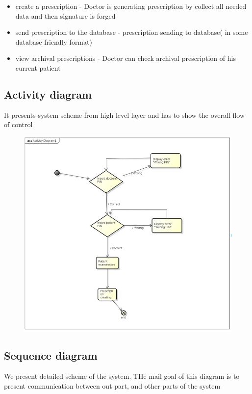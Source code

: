 \begin{itemize}


\item create a prescription - Doctor is generating prescription by collect all needed data and then signature is forged
\item send prescription to the database - prescription sending to database( in some database friendly format)
\item view archival prescriptions - Doctor can check archival prescription of his current patient
\end{itemize}

\subsection{Activity diagram}
It presents system scheme from high level layer and has to show the overall flow of control
\begin{figure}[h]
\centering
\includegraphics[width=1\textwidth]{doctor/ActivityDiagram.png}
\end{figure} 
\subsection{Sequence diagram}
We present detailed scheme of the system. THe mail goal of this diagram is to present communication between out part, and other parts of the system

